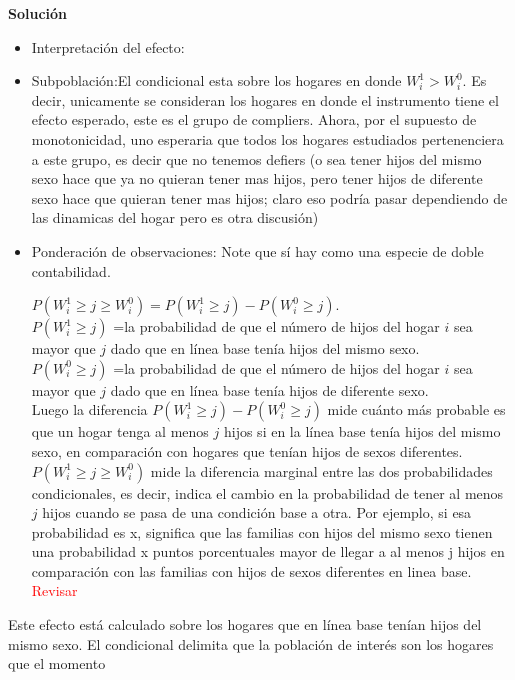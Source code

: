 \documentclass[a4paper, answers, addpoints, 11pt]{exam}
\newenvironment{solucion}{%
  \begin{mdframed}[
    backgroundcolor=blue!5,    %
    linecolor=blue!50,          %
    linewidth=2pt,              %
    leftmargin=10pt,            %
    rightmargin=8pt,           %
    topline=true,              %
    bottomline=true,            %
    roundcorner=10pt,           %
    innerleftmargin=10pt,       %
    innerrightmargin=10pt,      %
    innerbottommargin=10pt,     %
    innertopmargin=10pt         %
  ]%
  \begin{tcolorbox}[colframe=blue!50!black, colback=blue!50, coltitle=white, sharp corners=all, boxrule=1mm, width=\textwidth, halign=left, valign=center, top=0mm, bottom=0mm, left=0mm, right=0mm] \textbf{Solución} \end{tcolorbox} }{\end{mdframed}}
\begin{document}
\begin{enumerate}
      \begin{solucion}
      \begin{itemize}
          \item   Interpretación del efecto:
          \item Subpoblación:El condicional esta sobre los hogares en donde  $W_i^1  > W_i^0$. Es decir, unicamente se consideran los hogares en donde el instrumento tiene el efecto esperado, este es el grupo de compliers. Ahora, por el supuesto de monotonicidad, uno esperaria que todos los hogares estudiados pertenenciera a este grupo, es decir que no tenemos defiers (o sea tener hijos del mismo sexo hace que ya no quieran tener mas hijos, pero tener hijos de diferente sexo hace que quieran tener mas hijos; claro eso podría pasar dependiendo de las dinamicas del hogar pero es otra discusión)
          \item   Ponderación de observaciones: Note que sí hay como una especie de doble contabilidad. 

          $P(W_i^1 \geq j \geq W_i^0 )=P(W_i^1 \geq j )- P(W_i^0 \geq j) $.\\
          $P(W_i^1 \geq j )$ =la probabilidad de que el número de hijos del hogar $i$ sea mayor que $j$ dado que en línea base tenía hijos del mismo sexo.\\
          $P(W_i^0 \geq j )$ =la probabilidad de que el número de hijos del hogar $i$ sea mayor que $j$ dado que en línea base tenía hijos de diferente sexo.\\
          
          Luego la diferencia $P(W_i^1 \geq j )- P( W_i^0 \geq j)$ 
          mide cuánto más probable es que un hogar tenga al menos 
$j$ hijos si en la línea base tenía hijos del mismo sexo, en comparación con hogares que tenían hijos de sexos diferentes.\\

$P(W_i^1 \geq j \geq W_i^0 )$ mide la diferencia marginal entre las dos probabilidades condicionales, es decir, indica el cambio en la probabilidad de tener al menos $j$ hijos cuando se pasa de una condición base a otra. Por ejemplo, si esa probabilidad es x, significa que las familias con hijos del mismo sexo tienen una probabilidad x puntos porcentuales mayor de llegar a al menos j hijos en comparación con las familias con hijos de sexos diferentes en linea base.
\textcolor{red}{Revisar}
      
      \end{itemize}
  
     

     
      
      Este efecto está calculado sobre los hogares que en línea base tenían hijos del mismo sexo. El condicional delimita que la población de interés son los hogares que el momento 

      
\end{solucion}
   \end{enumerate}
        
\end{document}

